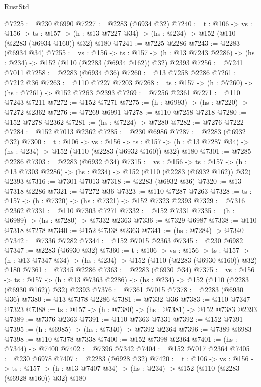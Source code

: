 \begin{lexlean}{RustStd}
\begin{coremodule}
@7225 := @230 @6990
@7227 := @2283 (@6934 @32)
@7240 := {t : @106} ->
  {vs : @156} ->
  {ts : @157} -> (h : @13 @7227 @34) -> (hs : @234) -> @152 (@110 (@2283 (@6934 @160)) @32) @180
@7241 := @7225 @2286
@7243 := @2283 (@6934 @34)
@7255 := {vs : @156} ->
  {ts : @157} -> (h : @13 @7243 @2286) -> (hs : @234) -> @152 (@110 (@2283 (@6934 @162)) @32) @2393
@7256 := @7241 @7011
@7258 := @2283 (@6934 @36)
@7260 := @13 @7258 @2286
@7261 := @7212 @36
@7263 := @110 @7227 @7203
@7268 := {ts : @157} -> (h : @7260) -> (hs : @7261) -> @152 @7263 @2393
@7269 := @7256 @2361
@7271 := @110 @7243 @7211
@7272 := @152 @7271
@7275 := (h : @6993) -> (hs : @7220) -> @7272 @2362
@7276 := @7269 @6991
@7278 := @110 @7258 @7218
@7280 := @152 @7278 @2362
@7281 := (hs : @7224) -> @7280
@7282 := @7276 @7222
@7284 := @152 @7013 @2362
@7285 := @230 @6986
@7287 := @2283 (@6932 @32)
@7300 := {t : @106} ->
  {vs : @156} ->
  {ts : @157} -> (h : @13 @7287 @34) -> (hs : @234) -> @152 (@110 (@2283 (@6932 @160)) @32) @180
@7301 := @7285 @2286
@7303 := @2283 (@6932 @34)
@7315 := {vs : @156} ->
  {ts : @157} -> (h : @13 @7303 @2286) -> (hs : @234) -> @152 (@110 (@2283 (@6932 @162)) @32) @2393
@7316 := @7301 @7013
@7318 := @2283 (@6932 @36)
@7320 := @13 @7318 @2286
@7321 := @7272 @36
@7323 := @110 @7287 @7263
@7328 := {ts : @157} -> (h : @7320) -> (hs : @7321) -> @152 @7323 @2393
@7329 := @7316 @2362
@7331 := @110 @7303 @7271
@7332 := @152 @7331
@7335 := (h : @6989) -> (hs : @7280) -> @7332 @2363
@7336 := @7329 @6987
@7338 := @110 @7318 @7278
@7340 := @152 @7338 @2363
@7341 := (hs : @7284) -> @7340
@7342 := @7336 @7282
@7344 := @152 @7015 @2363
@7345 := @230 @6982
@7347 := @2283 (@6930 @32)
@7360 := {t : @106} ->
  {vs : @156} ->
  {ts : @157} -> (h : @13 @7347 @34) -> (hs : @234) -> @152 (@110 (@2283 (@6930 @160)) @32) @180
@7361 := @7345 @2286
@7363 := @2283 (@6930 @34)
@7375 := {vs : @156} ->
  {ts : @157} -> (h : @13 @7363 @2286) -> (hs : @234) -> @152 (@110 (@2283 (@6930 @162)) @32) @2393
@7376 := @7361 @7015
@7378 := @2283 (@6930 @36)
@7380 := @13 @7378 @2286
@7381 := @7332 @36
@7383 := @110 @7347 @7323
@7388 := {ts : @157} -> (h : @7380) -> (hs : @7381) -> @152 @7383 @2393
@7389 := @7376 @2363
@7391 := @110 @7363 @7331
@7392 := @152 @7391
@7395 := (h : @6985) -> (hs : @7340) -> @7392 @2364
@7396 := @7389 @6983
@7398 := @110 @7378 @7338
@7400 := @152 @7398 @2364
@7401 := (hs : @7344) -> @7400
@7402 := @7396 @7342
@7404 := @152 @7017 @2364
@7405 := @230 @6978
@7407 := @2283 (@6928 @32)
@7420 := {t : @106} ->
  {vs : @156} ->
  {ts : @157} -> (h : @13 @7407 @34) -> (hs : @234) -> @152 (@110 (@2283 (@6928 @160)) @32) @180

\end{coremodule}
\end{lexlean}

